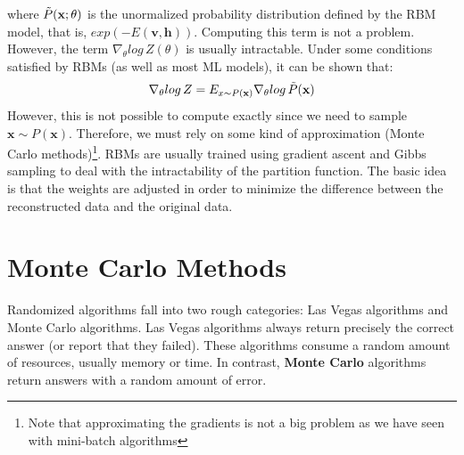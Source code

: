 where $\Tilde{P}(\textbf{x};\theta)$ is the unormalized probability distribution defined by the RBM model, that is, $exp(-E(\textbf{v}, \textbf{h}))$. Computing this term is not a problem. However, the term $\nabla_\theta log\, Z(\theta)$ is usually intractable.\newline\newline
Under some conditions satisfied by RBMs (as well as most ML models), it can
be shown that:
\[\nabla_\theta log\, Z = E_{x \sim P(\textbf{x})}\nabla_\theta log\, \Tilde{P}(\textbf{x})\]
However, this is not possible to compute exactly since we need to sample $\textbf{x} \sim P(\textbf{x})$. Therefore, we must rely on some kind of approximation (Monte Carlo methods)\footnote{Note that approximating the gradients is not a big problem as we have seen with mini-batch algorithms}.\newline\newline
RBMs are usually trained using gradient ascent and Gibbs sampling to deal with the intractability of the partition function. The basic idea is that the weights are adjusted in order to minimize the difference between the reconstructed data and the original data.

\section{Monte Carlo Methods}
Randomized algorithms fall into two rough categories: Las Vegas algorithms and Monte Carlo algorithms. Las Vegas algorithms always return precisely the correct answer (or report that they failed). These algorithms consume a random amount of resources, usually memory or time. In contrast, \textbf{Monte Carlo} algorithms return answers with a random amount of error.

